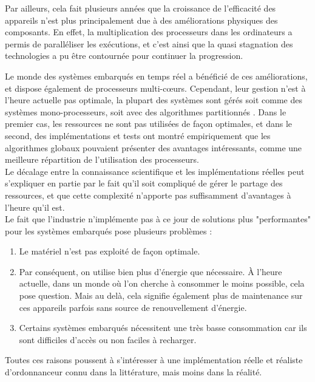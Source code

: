 \documentclass[11pt,a4paper,oneside]{report}
\begin{document}
Par ailleurs, cela fait plusieurs années que la croissance de l'efficacité des appareils n'est plus 
principalement due à des améliorations physiques des composants. 
En effet, la multiplication des processeurs dans les ordinateurs a permis
de paralléliser les exécutions, et c'est ainsi que la quasi stagnation des 
technologies a pu être contournée pour continuer la progression.

Le monde des systèmes embarqués en temps réel a bénéficié de ces améliorations, 
et dispose également de processeurs multi-c\oe{}urs. Cependant, leur gestion n'est 
à l'heure actuelle pas optimale, la plupart des systèmes sont  
gérés soit comme des systèmes mono-processeurs, soit avec des algorithmes partitionnés \cite{paolillo_new_nodate}. 
Dans le premier cas, les ressources ne sont pas utilisées de façon optimales, 
et dans le second, des implémentations et tests ont montré empiriquement 
que les algorithmes globaux pouvaient présenter des avantages intéressants, comme 
une meilleure répartition de l'utilisation des processeurs. 
\\ %

Le décalage entre la connaissance scientifique et les implémentations réelles 
peut s'expliquer en partie par le fait qu'il soit compliqué de gérer le partage des ressources, 
et que cette complexité n'apporte pas suffisamment d'avantages à l'heure qu'il est.\\

Le fait que l'industrie n'implémente pas à ce jour de solutions plus "performantes" 
pour les systèmes embarqués pose plusieurs problèmes :
\begin{enumerate}
	\item Le matériel n'est pas exploité de façon optimale.
	\item Par conséquent, on utilise bien plus d'énergie que nécessaire. 
	À l'heure actuelle, dans un monde où l'on cherche à consommer le moins possible, 
	cela pose question. Mais au delà, cela signifie également plus de maintenance 
	sur ces appareils parfois sans source de renouvellement d'énergie.
	\item Certains systèmes embarqués nécessitent une très basse consommation car 
	ils sont difficiles d'accès ou non faciles à recharger.
\end{enumerate}

Toutes ces raisons poussent à s'intéresser à une implémentation réelle et réaliste 
d'ordonnanceur connu dans la littérature, mais moins dans la réalité.
\end{document}
